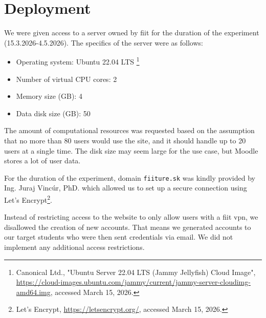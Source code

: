 
\section{Deployment}

We were given access to a server owned by \ac{fiit} for the duration of the experiment (15.3.2026-4.5.2026). The specifics of the server were as follows:

\begin{itemize}
    \item Operating system: Ubuntu 22.04 LTS \footnote{Canonical Ltd., "Ubuntu Server 22.04 LTS (Jammy Jellyfish) Cloud Image", \url{https://cloud-images.ubuntu.com/jammy/current/jammy-server-cloudimg-amd64.img}, accessed March 15, 2026.}
    \item Number of virtual CPU cores: 2
    \item Memory size (GB): 4
    \item Data disk size (GB): 50
\end{itemize}

The amount of computational resources was requested based on the assumption that no more than 80 users would use the site, and it should handle up to 20 users at a single time. The disk size may seem large for the use case, but Moodle stores a lot of user data.






For the duration of the experiment, domain \texttt{fiiture.sk} was kindly provided by Ing. Juraj Vincúr, PhD. which allowed us to set up a secure connection using Let’s Encrypt\footnote{Let’s Encrypt, \url{https://letsencrypt.org/}, accessed March 15, 2026.}.

Instead of restricting access to the website to only allow users with a \ac{fiit} \ac{vpn}, we disallowed the creation of new accounts. That means we generated accounts to our target students who were then sent credentials via email. We did not implement any additional access restrictions.

